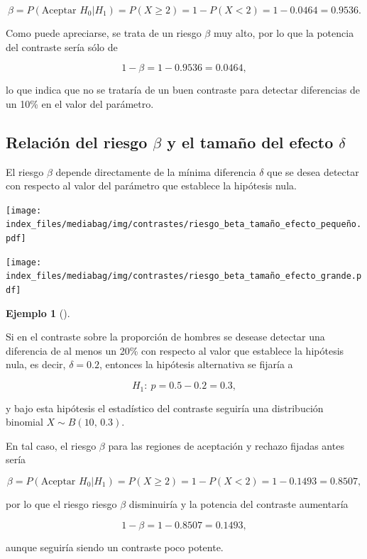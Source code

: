 \documentclass[
  a4paper,
]{scrreport}
\theoremstyle{plain}
\theoremstyle{definition}
\theoremstyle{definition}
\newtheorem{example}{Ejemplo}[chapter]
\theoremstyle{remark}
\begin{document}
\[\beta = P(\mbox{Aceptar }H_0|H_1) = P(X\geq 2) = 1 - P(X<2) = 1-0.0464 = 0.9536.\]

Como puede apreciarse, se trata de un riesgo \(\beta\) muy alto, por lo
que la potencia del contraste sería sólo de

\[1-\beta = 1-0.9536 = 0.0464,\]

lo que indica que no se trataría de un buen contraste para detectar
diferencias de un 10\% en el valor del parámetro.

\subsection{\texorpdfstring{Relación del riesgo \(\beta\) y el tamaño
del efecto
\(\delta\)}{Relación del riesgo \textbackslash beta y el tamaño del efecto \textbackslash delta}}\label{relaciuxf3n-del-riesgo-beta-y-el-tamauxf1o-del-efecto-delta}

El riesgo \(\beta\) depende directamente de la mínima diferencia
\(\delta\) que se desea detectar con respecto al valor del parámetro que
establece la hipótesis nula.

\begin{center}
\texttt{[image: index\_files/mediabag/img/contrastes/riesgo\_beta\_tamaño\_efecto\_pequeño.pdf]}
\end{center}

\begin{center}
\texttt{[image: index\_files/mediabag/img/contrastes/riesgo\_beta\_tamaño\_efecto\_grande.pdf]}
\end{center}

\begin{example}[]\protect\hypertarget{exm-potencia-contraste}{}\label{exm-potencia-contraste}

Si en el contraste sobre la proporción de hombres se desease detectar
una diferencia de al menos un 20\% con respecto al valor que establece
la hipótesis nula, es decir, \(\delta=0.2\), entonces la hipótesis
alternativa se fijaría a

\[H_1:\ p=0.5-0.2=0.3,\]

y bajo esta hipótesis el estadístico del contraste seguiría una
distribución binomial \(X\sim B(10,\,0.3)\).

En tal caso, el riesgo \(\beta\) para las regiones de aceptación y
rechazo fijadas antes sería

\[\beta = P(\mbox{Aceptar }H_0|H_1) = P(X\geq 2) = 1 - P(X<2) = 1-0.1493 = 0.8507,\]

por lo que el riesgo riesgo \(\beta\) disminuiría y la potencia del
contraste aumentaría

\[1-\beta = 1-0.8507 = 0.1493,\]

aunque seguiría siendo un contraste poco potente.

\end{example}
\end{document}
